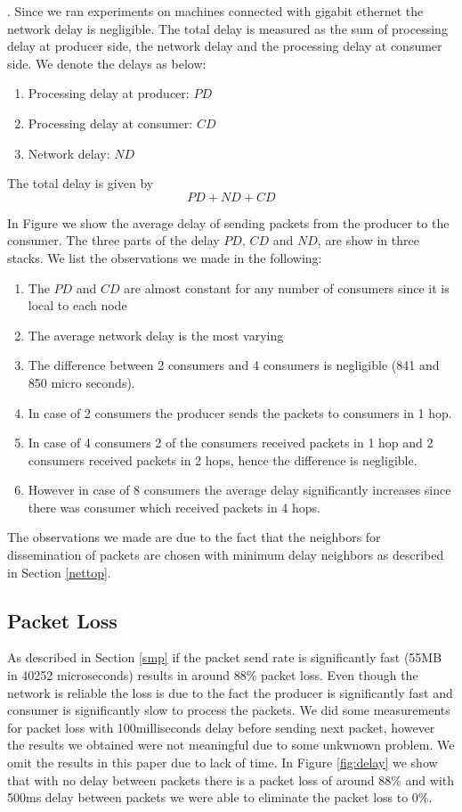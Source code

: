 . Since we ran experiments on machines connected with gigabit ethernet the network delay is negligible. The total delay is measured as the sum of processing delay at producer side, the network delay and the processing delay at consumer side. We denote the delays as below:
\begin{enumerate}
 \item Processing delay at producer: $PD$
\item Processing delay at consumer: $CD$
\item Network delay: $ND$
\end{enumerate}

The total delay is given by
\[
 PD + ND + CD
\]

In Figure \label{fig:delay} we show the average delay of sending packets from the producer to the consumer. The three parts of the delay $PD$, $CD$ and $ND$, are show in three stacks. We list the observations we made in the following:
\begin{enumerate}
 \item The $PD$ and $CD$ are almost constant for any number of consumers since it is local to each node
 \item The average network delay is the most varying 
 \item The difference between 2 consumers and 4 consumers is negligible (841 and 850 micro seconds). 
  \item In case of 2 consumers the producer sends the packets to consumers in 1 hop.
 \item In case of 4 consumers 2 of the consumers received packets in 1 hop and 2 consumers received packets in 2 hops, hence the difference is negligible.
\item However in case of 8 consumers the average delay significantly increases since there was consumer which received packets in 4 hops.
\end{enumerate}

The observations we made are due to the fact that the neighbors for dissemination of packets are chosen with minimum delay neighbors as described in Section \ref{nettop}.

\subsection{Packet Loss}
As described in Section \ref{smp} if the packet send rate is significantly fast (55MB in 40252 microseconds) results in around 88\% packet loss. Even though the network is reliable the loss is due to the fact the producer is significantly fast and consumer is significantly slow to process the packets. We did some measurements for packet loss with 100milliseconds delay before sending next packet, however the results we obtained were not meaningful due to some unkwnown problem. We omit the results in this paper due to lack of time. In Figure \ref{fig:delay} we show that with no delay between packets there is a packet loss of around 88\% and with 500ms delay between packets we were able to eliminate the packet loss to 0\%.
